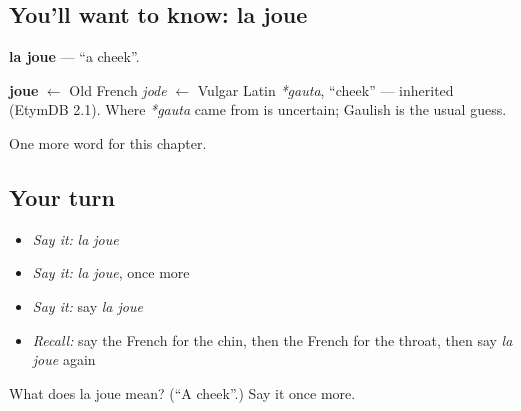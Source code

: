 \subsection*{You'll want to know: la joue}
\textbf{la joue} — \textquotedblleft{}a cheek\textquotedblright{}.

\begin{cousinweb}
\textbf{joue} $\leftarrow$ Old French \emph{jode} $\leftarrow$ Vulgar Latin \emph{*gauta}, \textquotedblleft{}cheek\textquotedblright{} — inherited (EtymDB 2.1). Where \emph{*gauta} came from is uncertain; Gaulish is the usual guess.
\end{cousinweb}

\begin{grammarlens}[title={What you've built}]
One more word for this chapter.
\end{grammarlens}

\subsection*{Your turn}
\begin{itemize}
\raggedright
  \item \emph{Say it:} \emph{la joue}
  \item \emph{Say it:} \emph{la joue}, once more
  \item \emph{Say it:} say \emph{la joue}
  \item \emph{Recall:} say the French for the chin, then the French for the throat, then say \emph{la joue} again
\end{itemize}

\begin{tcolorbox}[breakable,colback=teal!4,colframe=teal!35!black,title={Before you move on}]
What does la joue mean? (\textquotedblleft{}A cheek\textquotedblright{}.) Say it once more.
\end{tcolorbox}
